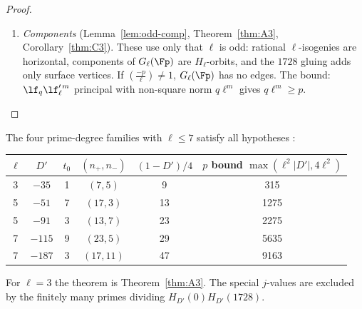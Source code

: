 \begin{proof}
\begin{enumerate}[label=(\roman*)]
  eigenvalues on $E_1[n_\pm]$.  The rational kernels are $E_1[\lf_{n_\pm}]$, and $E_2=[\lf_{n_+}]E_1$,
  $\tw E_2=[\lf_{n_-}]E_1$ (or the reverse, depending on the sign of $t$; the criterion is symmetric).
\item \emph{Components} (Lemma~\ref{lem:odd-comp}, Theorem~\ref{thm:A3}, Corollary~\ref{thm:C3}).  These use only that $\ell$
  is odd: rational $\ell$-isogenies are horizontal, components of $G_\ell(\Fp)$ are $H_\ell$-orbits, and the $1728$ gluing adds only
  surface vertices.  If $(\frac{-p}\ell)\neq1$, $G_\ell(\Fp)$ has no edges.  The bound: $\lf_q\lf_\ell'^{\,m}$ principal with
  non-square norm $q\ell^m$ gives $q\ell^m\ge p$.
\end{enumerate}
\end{proof}

\noindent The four prime-degree families with $\ell\le7$ satisfy all hypotheses \tagX:
\begin{center}\small
\begin{tabular}{@{}cccccc@{}}
\toprule
$\ell$ & $D'$ & $t_0$ & $(n_+,n_-)$ & $(1-D')/4$ & $p$ bound $\max(\ell^2|D'|,4\ell^2)$\\
\midrule
3 & $-35$ & 1 & $(7,5)$ & 9 & 315\\
5 & $-51$ & 7 & $(17,3)$ & 13 & 1275\\
5 & $-91$ & 3 & $(13,7)$ & 23 & 2275\\
7 & $-115$ & 9 & $(23,5)$ & 29 & 5635\\
7 & $-187$ & 3 & $(17,11)$ & 47 & 9163\\
\bottomrule
\end{tabular}
\end{center}
For $\ell=3$ the theorem is Theorem~\ref{thm:A3}.  The special $j$-values are excluded by the finitely many primes dividing
$H_{D'}(0)H_{D'}(1728)$.
